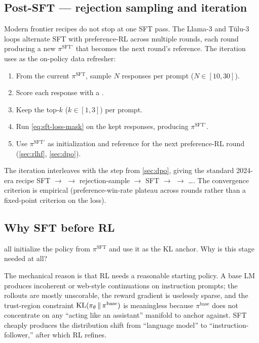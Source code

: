 \subsection{Post-SFT — rejection sampling and iteration}
\label{sec:sft-iteration}

Modern frontier recipes do not stop at one SFT pass. The Llama-3
\citep{meta-llama3} and T\"ulu-3 \citep{tulu3} loops alternate SFT
with preference-RL across multiple rounds, each round producing a new
$\pi^{\mathrm{SFT}'}$ that becomes the next round's reference. The
iteration uses  as the on-policy data refresher:

\begin{enumerate}
\item From the current $\pi^{\mathrm{SFT}}$, sample $N$ responses per
prompt ($N \in [10, 30]$).
\item Score each response with a .
\item Keep the top-$k$ ($k \in [1, 3]$) per prompt.
\item Run \cref{eq:sft-loss-mask} on the kept responses, producing
$\pi^{\mathrm{SFT}'}$.
\item Use $\pi^{\mathrm{SFT}'}$ as initialization and reference for the
next preference-RL round (\cref{sec:rlhf}, \cref{sec:dpo}).
\end{enumerate}

The iteration interleaves with the  step from \cref{sec:dpo},
giving the standard 2024-era recipe SFT $\to$  $\to$ rejection-sample
$\to$ SFT $\to$  $\to$ \ldots. The convergence criterion is
empirical (preference-win-rate plateau across rounds rather than a
fixed-point criterion on the loss).

\subsection{Why SFT before RL}
\label{sec:sft-before-rl}

 all initialize the policy from
$\pi^{\mathrm{SFT}}$ and use it as the KL anchor. Why is this stage
needed at all?

The mechanical reason is that RL needs a reasonable starting policy.
A base LM produces incoherent or web-style continuations on instruction
prompts; the rollouts are mostly unscorable, the reward gradient is
uselessly sparse, and the trust-region constraint
$\operatorname{KL}(\pi_\theta \,\|\, \pi^{\mathrm{base}})$ is meaningless because
$\pi^{\mathrm{base}}$ does not concentrate on any ``acting like an
assistant'' manifold to anchor against. SFT cheaply produces the
distribution shift from ``language model'' to
``instruction-follower,'' after which RL refines.

